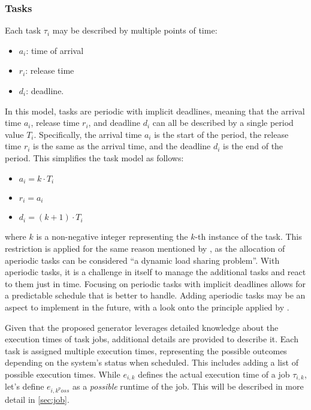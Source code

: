 \subsubsection{Tasks}\label{sec:task}
Each task $\tau_i$ may be described by multiple points of time:
\begin{itemize}
  \item $a_i$: time of arrival
  \item $r_i$: release time
  \item $d_i$: deadline.
\end{itemize}
In this model, tasks are periodic with implicit deadlines, meaning that the arrival time $a_i$, release time $r_i$, and deadline $d_i$ can all be described by a single period value $T_i$. 
Specifically, the arrival time $a_i$ is the start of the period, the release time $r_i$ is the same as the arrival time, and the deadline $d_i$ is the end of the period. 
This simplifies the task model as follows:
\begin{itemize}
  \item $a_i = k \cdot T_i$
  \item $r_i = a_i$
  \item $d_i = (k + 1) \cdot T_i$
\end{itemize}
where $k$ is a non-negative integer representing the $k$-th instance of the task.
This restriction is applied for the same reason mentioned by \textcite{dar-tzenpengAssignmentSchedulingCommunicating1997}, as the allocation of aperiodic tasks can be considered ``a dynamic load sharing problem''\cite{dar-tzenpengAssignmentSchedulingCommunicating1997}. 
With aperiodic tasks, it is a challenge in itself to manage the additional tasks and react to them just in time.
Focusing on periodic tasks with implicit deadlines allows for a predictable schedule that is better to handle.
Adding aperiodic tasks may be an aspect to implement in the future, with a look onto the principle applied by \textcite{dar-tzenpengAssignmentSchedulingCommunicating1997}.

Given that the proposed generator leverages detailed knowledge about the execution times of task jobs, additional details are provided to describe it. 
Each task is assigned multiple execution times, representing the possible outcomes depending on the system's status when scheduled. This includes adding a list of possible execution times.
While $e_{i,k}$ defines the actual execution time of a job $\tau_{i,k}$\cite{buttazzoHardRealTimeComputing2024}, let's define $e_{{i,k}^poss}$ as a \textit{possible} runtime of the job.
This will be described in more detail in \cref{sec:job}.

